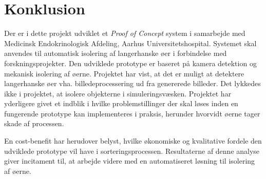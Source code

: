 \chapter{Konklusion}
Der er i dette projekt udviklet et \textit{Proof of Concept} system i samarbejde med Medicinsk Endokrinologisk Afdeling, Aarhus Universitetshospital. Systemet skal anvendes til automatisk isolering af langerhanske øer i forbindelse med forskningsprojekter. Den udviklede prototype er baseret på kamera detektion og mekanisk isolering af øerne. Projektet har vist, at det er muligt at detektere langerhanske øer vha. billedeprocessering ud fra genererede billeder. Det lykkedes ikke i projektet, at isolere objekterne i simuleringsvæsken. Projektet har yderligere givet et indblik i hvilke problemstillinger der skal løses inden en fungerende prototype kan implementeres i praksis, herunder hvorvidt øerne tager skade af processen. 

En cost-benefit har herudover belyst, hvilke økonomiske og kvalitative fordele den udviklede prototype vil have i sorteringsprocessen. Resultaterne af denne analyse giver incitament til, at arbejde videre med en automatiseret løsning til isolering af øerne. 

